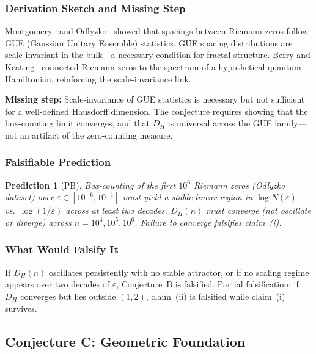 \documentclass[12pt]{article}
\theoremstyle{lawstyle}
\theoremstyle{conjstyle}
\theoremstyle{predstyle}
\newtheorem{prediction}{Prediction}
\begin{document}
\subsubsection*{Derivation Sketch and Missing Step}

Montgomery~\cite{montgomery1973} and Odlyzko~\cite{odlyzko1987} showed that spacings between
Riemann zeros follow GUE (Gaussian Unitary Ensemble) statistics. GUE spacing distributions
are scale-invariant in the bulk---a necessary condition for fractal structure.
Berry and Keating~\cite{berry1999} connected Riemann zeros to the spectrum of a hypothetical
quantum Hamiltonian, reinforcing the scale-invariance link.

\textbf{Missing step:} Scale-invariance of GUE statistics is necessary but not sufficient
for a well-defined Hausdorff dimension. The conjecture requires showing that the
box-counting limit converges, and that $D_H$ is universal across the GUE family---not an
artifact of the zero-counting measure.

\subsubsection*{Falsifiable Prediction}

\begin{prediction}[PB]
Box-counting of the first $10^6$ Riemann zeros (Odlyzko dataset) over
$\varepsilon \in [10^{-6}, 10^{-1}]$ must yield a stable linear region in
$\log N(\varepsilon)$ vs.\ $\log(1/\varepsilon)$ across at least two decades.
$D_H(n)$ must converge (not oscillate or diverge) across $n = 10^4, 10^5, 10^6$.
Failure to converge falsifies claim~(i).
\end{prediction}

\subsubsection*{What Would Falsify It}

If $D_H(n)$ oscillates persistently with no stable attractor, or if no scaling regime
appears over two decades of $\varepsilon$, Conjecture~B is falsified. Partial falsification:
if $D_H$ converges but lies outside $(1,2)$, claim~(ii) is falsified while claim~(i)
survives.

\bigskip

\subsection{Conjecture C: Geometric Foundation}
\end{document}
